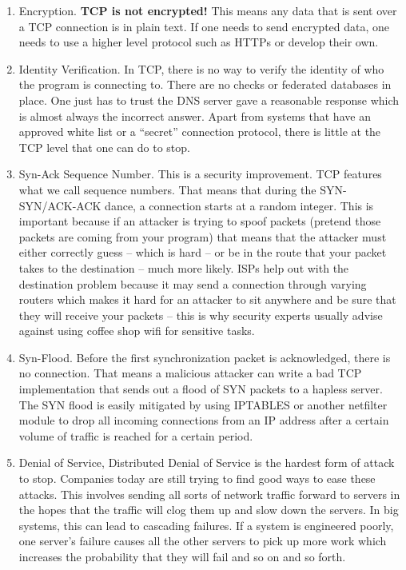 \begin{enumerate}
\item Encryption.
  \textbf{TCP is not encrypted!} This means any data that is sent over a TCP connection is in plain text.
  If one needs to send encrypted data, one needs to use a higher level protocol such as HTTPs or develop their own.
\item Identity Verification.
  In TCP, there is no way to verify the identity of who the program is connecting to.
  There are no checks or federated databases in place.
  One just has to trust the DNS server gave a reasonable response which is almost always the incorrect answer.
  Apart from systems that have an approved white list or a ``secret'' connection protocol, there is little at the TCP level that one can do to stop.
\item Syn-Ack Sequence Number.
  This is a security improvement.
  TCP features what we call sequence numbers.
  That means that during the SYN-SYN/ACK-ACK dance, a connection starts at a random integer.
  This is important because if an attacker is trying to spoof packets (pretend those packets are coming from your program) that means that the attacker must either correctly guess -- which is hard -- or be in the route that your packet takes to the destination -- much more likely.
  ISPs help out with the destination problem because it may send a connection through varying routers which makes it hard for an attacker to sit anywhere and be sure that they will receive your packets -- this is why security experts usually advise against using coffee shop wifi for sensitive tasks.
\item Syn-Flood.
  Before the first synchronization packet is acknowledged, there is no connection.
  That means a malicious attacker can write a bad TCP implementation that sends out a flood of SYN packets to a hapless server.
  The SYN flood is easily mitigated by using IPTABLES or another netfilter module to drop all incoming connections from an IP address after a certain volume of traffic is reached for a certain period.
\item Denial of Service, Distributed Denial of Service is the hardest form of attack to stop.
  Companies today are still trying to find good ways to ease these attacks.
  This involves sending all sorts of network traffic forward to servers in the hopes that the traffic will clog them up and slow down the servers.
  In big systems, this can lead to cascading failures. If a system is engineered poorly, one server's failure causes all the other servers to pick up more work which increases the probability that they will fail and so on and so forth.
\end{enumerate}

